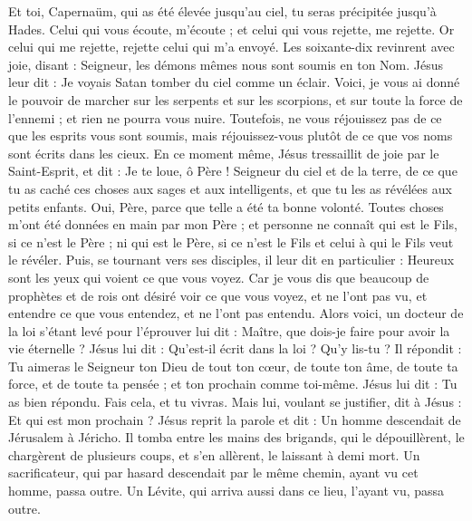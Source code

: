 \begin{multicols}{2}
Et toi, Capernaüm, qui as été élevée jusqu'au ciel, tu seras précipitée jusqu'à Hades.
Celui qui vous écoute, m'écoute ; et celui qui vous rejette, me rejette. Or celui qui me rejette, rejette celui qui m'a envoyé.
Les soixante-dix revinrent avec joie, disant : Seigneur, les démons mêmes nous sont soumis en ton Nom.
Jésus leur dit : Je voyais Satan tomber du ciel comme un éclair.
Voici, je vous ai donné le pouvoir de marcher sur les serpents et sur les scorpions, et sur toute la force de l'ennemi ; et rien ne pourra vous nuire.
Toutefois, ne vous réjouissez pas de ce que les esprits vous sont soumis, mais réjouissez-vous plutôt de ce que vos noms sont écrits dans les cieux.
En ce moment même, Jésus tressaillit de joie par le Saint-Esprit, et dit : Je te loue, ô Père ! Seigneur du ciel et de la terre, de ce que tu as caché ces choses aux sages et aux intelligents, et que tu les as révélées aux petits enfants. Oui, Père, parce que telle a été ta bonne volonté.
Toutes choses m'ont été données en main par mon Père ; et personne ne connaît qui est le Fils, si ce n'est le Père ; ni qui est le Père, si ce n'est le Fils et celui à qui le Fils veut le révéler.
Puis, se tournant vers ses disciples, il leur dit en particulier : Heureux sont les yeux qui voient ce que vous voyez.
Car je vous dis que beaucoup de prophètes et de rois ont désiré voir ce que vous voyez, et ne l'ont pas vu, et entendre ce que vous entendez, et ne l'ont pas entendu.
Alors voici, un docteur de la loi s'étant levé pour l'éprouver lui dit : Maître, que dois-je faire pour avoir la vie éternelle ?
Jésus lui dit : Qu'est-il écrit dans la loi ? Qu'y lis-tu ?
Il répondit : Tu aimeras le Seigneur ton Dieu de tout ton cœur, de toute ton âme, de toute ta force, et de toute ta pensée ; et ton prochain comme toi-même.
Jésus lui dit : Tu as bien répondu. Fais cela, et tu vivras.
Mais lui, voulant se justifier, dit à Jésus : Et qui est mon prochain ?
Jésus reprit la parole et dit : Un homme descendait de Jérusalem à Jéricho. Il tomba entre les mains des brigands, qui le dépouillèrent, le chargèrent de plusieurs coups, et s'en allèrent, le laissant à demi mort.
Un sacrificateur, qui par hasard descendait par le même chemin, ayant vu cet homme, passa outre.
Un Lévite, qui arriva aussi dans ce lieu, l'ayant vu, passa outre.

\end{multicols}
